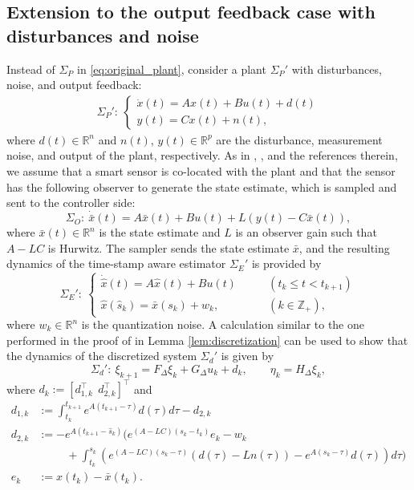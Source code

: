 \documentclass[letterpaper, 12pt, draftcls, onecolumn]{ieeeconf}
\begin{document}
\subsection{Extension to the output feedback case 
	with disturbances and noise}
Instead of $\Sigma_P$ in \eqref{eq:original_plant}, consider 
a plant $\Sigma_P'$ with disturbances, noise, and output feedback:
\begin{align*}
\Sigma_P':~
\begin{cases}
\dot x(t) = A x(t) + Bu(t) + d(t) \\
y(t) = Cx(t) + n(t),
\end{cases}
\end{align*}
where $d(t) \in \mathbb{R}^{n}$ and $n(t)$, $y(t) \in \mathbb{R}^p$
are the disturbance, measurement noise, and output of the plant, respectively.
As in \cite[Chap.~3]{Garcia2014}, \cite{Xu2005CDC}, 
and the references therein, we assume that
a smart sensor is co-located with the
plant and that the sensor has the following observer to 
generate the state estimate, which is sampled and sent to the controller side:
\begin{equation*}
\Sigma_O:~
\dot{\bar x}(t) = A {\bar x}(t) + Bu(t) + L(y(t)-C\bar x(t)),
\end{equation*}
where $\bar x(t) \in \mathbb{R}^n$ is the state estimate and $L$ is an observer gain such that
$A-LC$ is Hurwitz.
The sampler sends the state estimate $\bar x$, 
and
the resulting dynamics of the time-stamp aware estimator $\Sigma_E'$ is provided by
\begin{equation*}
\Sigma_E':~
\begin{cases}
\dot{\hat x}(t) = A\hat{x}(t) + Bu(t)
&\qquad(t_k \leq t < t_{k+1})	 \\
\hat{x}(\hat s_k) = \bar x(s_k) + w_k,
&\qquad(k \in \mathbb{Z}_+),
\end{cases}
\end{equation*} 
where $w_k \in \mathbb{R}^n$ is the quantization noise. 
A calculation similar to the one performed in the proof of
in Lemma \ref{lem:discretization} can be used to show
that the dynamics of the discretized system $\Sigma_d'$ is given by
\begin{equation}
\label{eq:discre_sys_disturbances}
\Sigma_d':~
\xi_{k+1} = F_{\Delta} \xi_k + G_{\Delta} u_k + 
d_k,\qquad \eta_k = H_{\Delta}\xi_k,
\end{equation}
where $d_k := [
d_{1,k}^{\top}~~ d_{2,k}^{\top}
]^{\top}$ and
\begin{align*}
d_{1,k} &:= \int^{t_{k+1}}_{t_k} e^{A(t_{k+1}-\tau)} d(\tau) d\tau - d_{2,k}\\
d_{2,k} &:= 
-e^{A(t_{k+1}-\hat s_k)}
\Bigg(
e^{(A-LC)(s_k-t_k)}e_k - w_k  \\
&\hspace{30pt}+ \int^{s_k}_{t_k} 
\left(
e^{(A-LC)(s_k-\tau)} (d(\tau)-Ln(\tau)) 
- e^{A(s_k-\tau)} d(\tau) \right) d\tau
\Bigg) \\
e_k &:= x(t_k) - \bar x(t_k). 
\end{align*}
\end{document}
